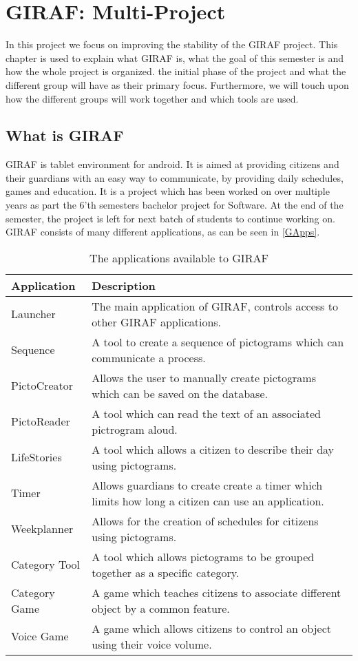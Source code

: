 \chapter{GIRAF: Multi-Project}

In this project we focus on improving the stability of the GIRAF project. This
chapter is used to explain what GIRAF is, what the goal of this semester is
and how the whole project is organized. the initial phase of the project and what the
different group will have as their primary focus. Furthermore, we will touch
upon how the different groups will work together and which tools are used.


\section{What is GIRAF}
GIRAF is tablet environment for android. It is aimed at providing citizens and
their guardians with an easy way to communicate, by providing daily schedules,
games and education. It is a project which has been worked on over multiple
years as part the 6'th semesters bachelor project for Software. At the end of
the semester, the project is left for next batch of students to continue working
on. GIRAF consists of many different applications, as can be seen in
\autoref{GApps}.
\begin{table}[H]
\centering
\label{GApps}
\begin{tabular}{|p{3cm}|p{9cm}|}
\hline
Application			& Description \\\hline
Launcher  			& The main application of GIRAF, controls access to other
GIRAF applications. \\\hline 
Sequence	       	& A tool to create a sequence of pictograms which can
communicate a process.\\\hline 
PictoCreator  	   	& Allows the user to manually create pictograms which can be
saved on the database.\\\hline
PictoReader	   		& A tool which can read the text of an associated pictrogram
aloud.\\\hline
LifeStories	   		& A tool which allows a citizen to describe their day using
pictograms.\\\hline 
Timer     	   		& Allows guardians to create create a timer which limits how
long a citizen can use an application.\\\hline 
Weekplanner 		& Allows for the creation of schedules for citizens
using pictograms. \\\hline 
Category Tool		& A tool which allows pictograms to be grouped together as a
specific category. \\\hline 
Category Game   	& A game which teaches citizens to associate different object
by a common feature. \\\hline 
Voice Game  		& A game which allows citizens to control an object using their
voice volume. \\\hline
\end{tabular}
\caption{The applications available to GIRAF}
\end{table}
